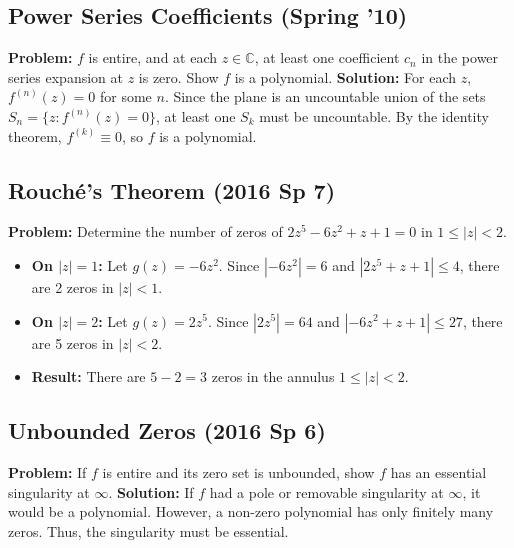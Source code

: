 \documentclass[11pt]{article}
\begin{document}
\subsection*{Power Series Coefficients (Spring '10)}
\textbf{Problem:} $f$ is entire, and at each $z \in \mathbb{C}$, at least one coefficient $c_n$ in the power series expansion at $z$ is zero. Show $f$ is a polynomial.
\textbf{Solution:} For each $z$, $f^{(n)}(z) = 0$ for some $n$. Since the plane is an uncountable union of the sets $S_n = \{z : f^{(n)}(z) = 0\}$, at least one $S_k$ must be uncountable. By the identity theorem, $f^{(k)} \equiv 0$, so $f$ is a polynomial.

\subsection*{Rouché's Theorem (2016 Sp 7)}
\textbf{Problem:} Determine the number of zeros of $2z^5 - 6z^2 + z + 1 = 0$ in $1 \le |z| < 2$.
\begin{itemize}
    \item \textbf{On $|z|=1$:} Let $g(z) = -6z^2$. Since $|-6z^2| = 6$ and $|2z^5 + z + 1| \le 4$, there are 2 zeros in $|z| < 1$.
    \item \textbf{On $|z|=2$:} Let $g(z) = 2z^5$. Since $|2z^5| = 64$ and $|-6z^2 + z + 1| \le 27$, there are 5 zeros in $|z| < 2$.
    \item \textbf{Result:} There are $5 - 2 = 3$ zeros in the annulus $1 \le |z| < 2$.
\end{itemize}

\subsection*{Unbounded Zeros (2016 Sp 6)}
\textbf{Problem:} If $f$ is entire and its zero set is unbounded, show $f$ has an essential singularity at $\infty$.
\textbf{Solution:} If $f$ had a pole or removable singularity at $\infty$, it would be a polynomial. However, a non-zero polynomial has only finitely many zeros. Thus, the singularity must be essential.
\end{document}
